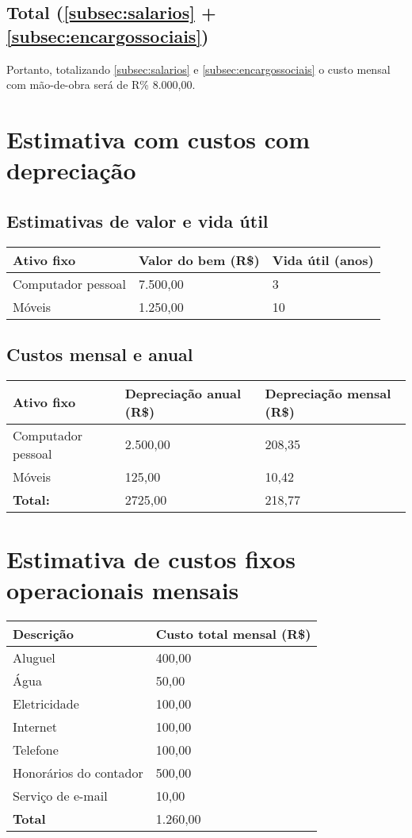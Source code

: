  \subsection{Total (\ref{subsec:salarios} + \ref{subsec:encargossociais})}
  
  Portanto, totalizando \ref{subsec:salarios} e \ref{subsec:encargossociais} o custo mensal com mão-de-obra será de R\% 8.000,00.
  
\section{Estimativa com custos com depreciação}

  \subsection{Estimativas de valor e vida útil}
  \begin{tabular}{| l | l | l |}
    \hline
    \textbf{Ativo fixo} & \textbf{Valor do bem (R\$)} & \textbf{Vida útil (anos)} \\ \hline
    Computador pessoal & 7.500,00 & 3\\ \hline
    Móveis & 1.250,00 & 10\\ \hline
  \end{tabular}

  \subsection{Custos mensal e anual}
  \begin{tabular}{| l | l | l |}
    \hline
    \textbf{Ativo fixo} & \textbf{Depreciação anual (R\$)}  & \textbf{Depreciação mensal (R\$)} \\ \hline
    Computador pessoal & 2.500,00 & 208,35\\ \hline
    Móveis & 125,00 & 10,42\\ \hline
    \textbf{Total:} & 2725,00 & 218,77 \\ \hline
  \end{tabular}
  
\section{Estimativa de custos fixos operacionais mensais}

\begin{tabular}{| l | l |}
  \hline
  \textbf{Descrição} & \textbf{Custo total mensal (R\$)} \\ \hline
  Aluguel & 400,00 \\ \hline
  Água & 50,00 \\ \hline
  Eletricidade & 100,00 \\ \hline
  Internet & 100,00 \\ \hline
  Telefone & 100,00 \\ \hline
  Honorários do contador & 500,00 \\ \hline
  Serviço de e-mail & 10,00 \\ \hline
  \textbf{Total} & 1.260,00 \\ \hline
\end{tabular}
